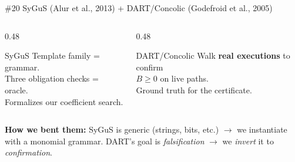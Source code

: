 \documentclass[aspectratio=169]{beamer}
\begin{document}
\begin{frame}{\#20 SyGuS (Alur et al., 2013) + DART/Concolic (Godefroid et al., 2005)}
\begin{columns}[c]
\begin{column}{0.48\textwidth}
\begin{block}{SyGuS}
Template family = grammar.\\
Three obligation checks = oracle.\\
Formalizes our coefficient search.
\end{block}
\end{column}
\begin{column}{0.48\textwidth}
\begin{block}{DART/Concolic}
Walk \textbf{real executions} to confirm\\$B \ge 0$ on live paths.\\Ground truth for the certificate.
\end{block}
\end{column}
\end{columns}

\vspace{0.8em}
\textbf{How we bent them:} SyGuS is generic (strings, bits, etc.) $\to$ we instantiate with a monomial grammar. DART's goal is \emph{falsification} $\to$ we \emph{invert} it to \emph{confirmation}.
\end{frame}

\end{document}
